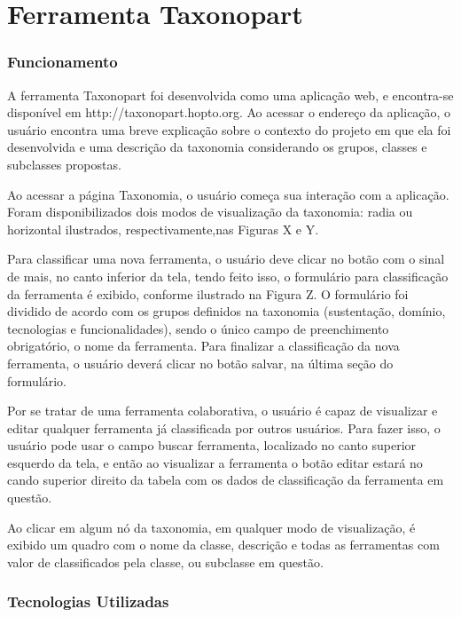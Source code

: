 \chapter[Ferramenta]{Ferramenta Taxonopart}
\label{cap:cap3}

\subsection{Funcionamento}
\label{sec:funcionamento}
A ferramenta Taxonopart foi desenvolvida como uma aplicação web, e encontra-se disponível em http://taxonopart.hopto.org.
Ao acessar o endereço da aplicação, o usuário encontra uma breve explicação sobre o contexto do projeto em que ela foi desenvolvida e uma descrição da taxonomia considerando os grupos, classes e subclasses propostas.

\par
Ao acessar a página Taxonomia, o usuário começa sua interação com a aplicação. Foram disponibilizados dois modos de visualização da taxonomia: radia ou horizontal ilustrados, respectivamente,nas Figuras X e Y.

Para classificar uma nova ferramenta, o usuário deve clicar no botão com o  sinal de mais, no canto inferior da tela, tendo feito isso,
o formulário para classificação da ferramenta é exibido, conforme ilustrado na Figura Z. O formulário foi dividido de acordo com os grupos definidos na taxonomia (sustentação, domínio, tecnologias e funcionalidades), sendo o único campo de preenchimento
obrigatório, o nome da ferramenta. Para finalizar a classificação da nova ferramenta, o usuário deverá clicar no botão salvar, na última seção do formulário. 

\par
Por se tratar de uma ferramenta colaborativa, o usuário é capaz de visualizar e editar qualquer ferramenta já classificada por outros usuários. 
Para fazer isso, o usuário pode usar o campo buscar ferramenta, localizado no canto superior esquerdo da tela, e então ao visualizar a ferramenta o botão editar estará 
no cando superior direito da tabela com os dados de classificação da ferramenta em questão.

\par
Ao clicar em algum nó da taxonomia, em qualquer modo de visualização, é exibido um quadro com o nome da classe, descrição e todas as ferramentas
com valor de classificados pela classe, ou subclasse em questão.

\subsection{Tecnologias Utilizadas}
\label{subsec:tecnologias}

